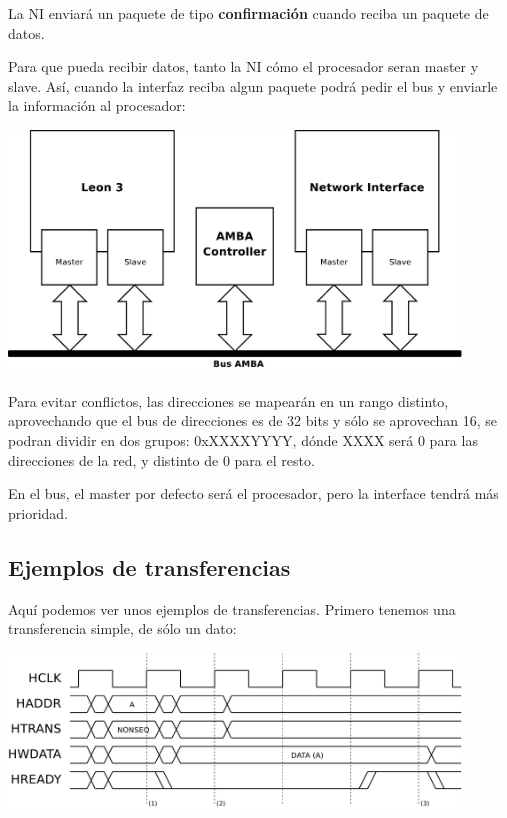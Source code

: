 \documentclass[a4paper, 12pt, babel, spanish]{article}
\begin{document}
La NI enviará un paquete de tipo \textbf{confirmación} cuando reciba un paquete de datos.

Para que pueda recibir datos, tanto la NI cómo el procesador seran master y slave. Así, cuando la interfaz reciba algun paquete podrá pedir el bus y enviarle la información al procesador: 

\begin{center}
\includegraphics[width=0.9\textwidth]{fig/schem/bus_general}
\end{center}

Para evitar conflictos, las direcciones se mapearán en un rango distinto, aprovechando que el bus de direcciones es de 32 bits y sólo se aprovechan 16, se podran dividir en dos grupos: 0xXXXXYYYY, dónde XXXX será 0 para las direcciones de la red, y distinto de 0 para el resto. 

En el bus, el master por defecto será el procesador, pero la interface tendrá más prioridad.

\subsection*{Ejemplos de transferencias}

Aquí podemos ver unos ejemplos de transferencias. Primero tenemos una transferencia simple, de sólo un dato:

\begin{center}
\includegraphics[width=0.9\textwidth]{fig/waves/trans_norm}
\end{center}
\end{document}
